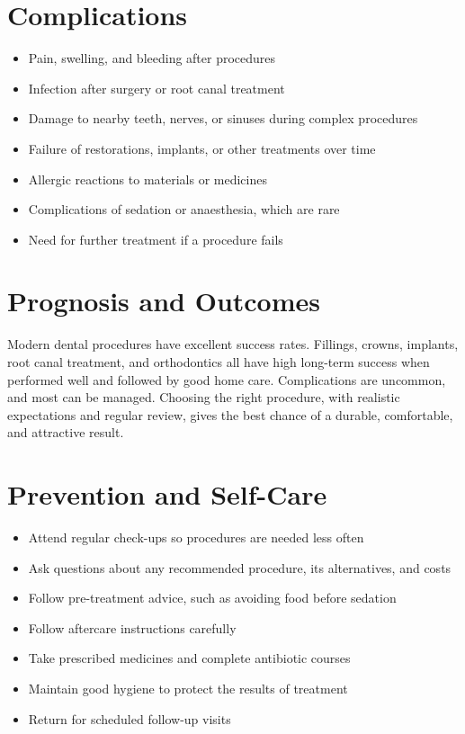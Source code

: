 \section*{Complications}
\begin{itemize}
    \item Pain, swelling, and bleeding after procedures
    \item Infection after surgery or root canal treatment
    \item Damage to nearby teeth, nerves, or sinuses during complex procedures
    \item Failure of restorations, implants, or other treatments over time
    \item Allergic reactions to materials or medicines
    \item Complications of sedation or anaesthesia, which are rare
    \item Need for further treatment if a procedure fails
\end{itemize}

\section*{Prognosis and Outcomes}
Modern dental procedures have excellent success rates. Fillings, crowns, implants, root canal treatment, and orthodontics all have high long-term success when performed well and followed by good home care. Complications are uncommon, and most can be managed. Choosing the right procedure, with realistic expectations and regular review, gives the best chance of a durable, comfortable, and attractive result.

\section*{Prevention and Self-Care}
\begin{itemize}
    \item Attend regular check-ups so procedures are needed less often
    \item Ask questions about any recommended procedure, its alternatives, and costs
    \item Follow pre-treatment advice, such as avoiding food before sedation
    \item Follow aftercare instructions carefully
    \item Take prescribed medicines and complete antibiotic courses
    \item Maintain good hygiene to protect the results of treatment
    \item Return for scheduled follow-up visits
\end{itemize}

